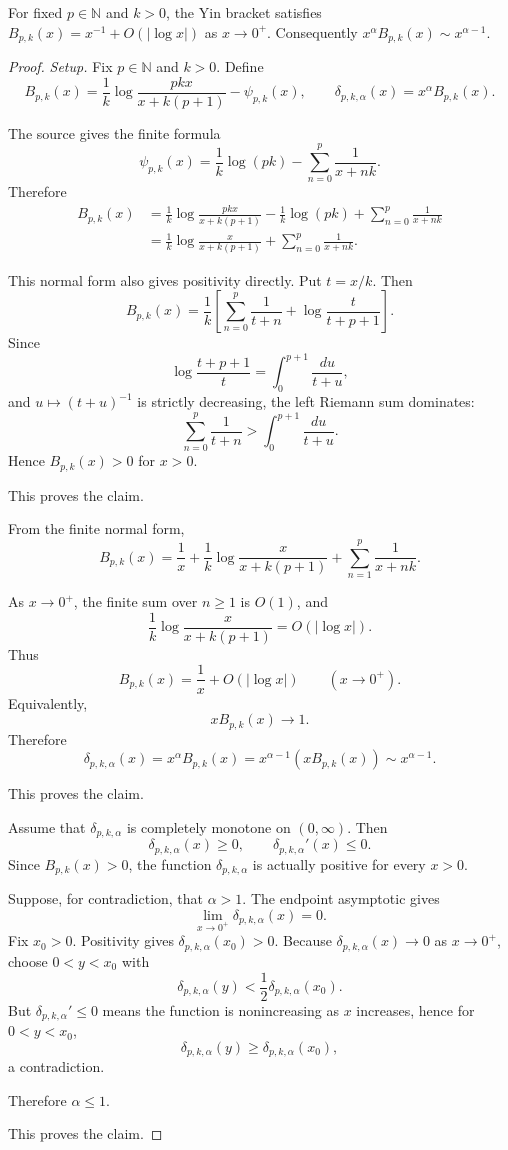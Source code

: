 \begin{proposition}
\label{res:yin-pk-digamma-near-zero-asymptotic}
For fixed \(p\in\mathbb N\) and \(k>0\), the Yin bracket satisfies \(B_{p,k}(x)=x^{-1}+O(|\log x|)\) as \(x\to0^+\). Consequently \(x^\alpha B_{p,k}(x)\sim x^{\alpha-1}\).
\end{proposition}
\begin{proof}
\emph{Setup.}
Fix \(p\in\mathbb N\) and \(k>0\). Define
\[
B_{p,k}(x)=
\frac1k\log\frac{pkx}{x+k(p+1)}-\psi_{p,k}(x),
\qquad
\delta_{p,k,\alpha}(x)=x^\alpha B_{p,k}(x).
\]

The source gives the finite formula
\[
\psi_{p,k}(x)=\frac1k\log(pk)-\sum_{n=0}^p\frac1{x+nk}.
\]
Therefore
\[
\begin{aligned}
B_{p,k}(x)
&=
\frac1k\log\frac{pkx}{x+k(p+1)}
-\frac1k\log(pk)
+\sum_{n=0}^p\frac1{x+nk}  \\
&=
\frac1k\log\frac{x}{x+k(p+1)}
+\sum_{n=0}^p\frac1{x+nk}.
\end{aligned}
\]

This normal form also gives positivity directly. Put \(t=x/k\). Then
\[
B_{p,k}(x)
=\frac1k\left[
\sum_{n=0}^p\frac1{t+n}
+\log\frac{t}{t+p+1}
\right].
\]
Since
\[
\log\frac{t+p+1}{t}=\int_0^{p+1}\frac{du}{t+u},
\]
and \(u\mapsto(t+u)^{-1}\) is strictly decreasing, the left Riemann sum dominates:
\[
\sum_{n=0}^p\frac1{t+n}
>
\int_0^{p+1}\frac{du}{t+u}.
\]
Hence \(B_{p,k}(x)>0\) for \(x>0\).

This proves the claim.

From the finite normal form,
\[
B_{p,k}(x)
=\frac1x
+\frac1k\log\frac{x}{x+k(p+1)}
+\sum_{n=1}^p\frac1{x+nk}.
\]

As \(x\to0^+\), the finite sum over \(n\ge1\) is \(O(1)\), and
\[
\frac1k\log\frac{x}{x+k(p+1)}=O(|\log x|).
\]
Thus
\[
B_{p,k}(x)=\frac1x+O(|\log x|)
\qquad (x\to0^+).
\]
Equivalently,
\[
xB_{p,k}(x)\to1.
\]
Therefore
\[
\delta_{p,k,\alpha}(x)
=x^\alpha B_{p,k}(x)
=x^{\alpha-1}(xB_{p,k}(x))
\sim x^{\alpha-1}.
\]

This proves the claim.

Assume that \(\delta_{p,k,\alpha}\) is completely monotone on \((0,\infty)\). Then
\[
\delta_{p,k,\alpha}(x)\ge0,\qquad
\delta_{p,k,\alpha}'(x)\le0.
\]
Since \(B_{p,k}(x)>0\), the function \(\delta_{p,k,\alpha}\) is actually positive for every \(x>0\).

Suppose, for contradiction, that \(\alpha>1\). The endpoint asymptotic gives
\[
\lim_{x\to0^+}\delta_{p,k,\alpha}(x)=0.
\]
Fix \(x_0>0\). Positivity gives \(\delta_{p,k,\alpha}(x_0)>0\). Because \(\delta_{p,k,\alpha}(x)\to0\) as \(x\to0^+\), choose \(0<y<x_0\) with
\[
\delta_{p,k,\alpha}(y)<\frac12\delta_{p,k,\alpha}(x_0).
\]
But \(\delta_{p,k,\alpha}'\le0\) means the function is nonincreasing as \(x\) increases, hence for \(0<y<x_0\),
\[
\delta_{p,k,\alpha}(y)\ge\delta_{p,k,\alpha}(x_0),
\]
a contradiction.

Therefore \(\alpha\le1\).

This proves the claim.
\end{proof}

